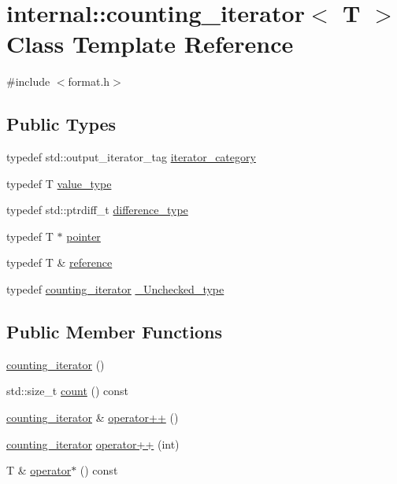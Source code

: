 \hypertarget{classinternal_1_1counting__iterator}{}\section{internal\+:\+:counting\+\_\+iterator$<$ T $>$ Class Template Reference}
\label{classinternal_1_1counting__iterator}


{\ttfamily \#include $<$format.\+h$>$}

\subsection*{Public Types}
\begin{DoxyCompactItemize}
\item 
typedef std\+::output\+\_\+iterator\+\_\+tag \hyperlink{classinternal_1_1counting__iterator_a2401fdba243c84c268b562611bed7333}{iterator\+\_\+category}
\item 
typedef T \hyperlink{classinternal_1_1counting__iterator_abc8a1cdd0ab07ab8a4c02df99233017a}{value\+\_\+type}
\item 
typedef std\+::ptrdiff\+\_\+t \hyperlink{classinternal_1_1counting__iterator_a9b409b0895044059511e67a9fb46aff4}{difference\+\_\+type}
\item 
typedef T $\ast$ \hyperlink{classinternal_1_1counting__iterator_a0e58a232d34bffbc41fc5bd7bb75f962}{pointer}
\item 
typedef T \& \hyperlink{classinternal_1_1counting__iterator_a040c67c71ec6569100eda9296fbd914f}{reference}
\item 
typedef \hyperlink{classinternal_1_1counting__iterator}{counting\+\_\+iterator} \hyperlink{classinternal_1_1counting__iterator_ab0bb803614313da57e902e8f5ac2095d}{\+\_\+\+Unchecked\+\_\+type}
\end{DoxyCompactItemize}
\subsection*{Public Member Functions}
\begin{DoxyCompactItemize}
\item 
\hyperlink{classinternal_1_1counting__iterator_af6e3751c9b296b56d7b96975b746abfe}{counting\+\_\+iterator} ()
\item 
std\+::size\+\_\+t \hyperlink{classinternal_1_1counting__iterator_a452e9d9c9038962166ddb7be18d2f029}{count} () const
\item 
\hyperlink{classinternal_1_1counting__iterator}{counting\+\_\+iterator} \& \hyperlink{classinternal_1_1counting__iterator_a30040f9f47ccc17bb246fa0d55795e63}{operator++} ()
\item 
\hyperlink{classinternal_1_1counting__iterator}{counting\+\_\+iterator} \hyperlink{classinternal_1_1counting__iterator_add98096772b9b8e8f5da7ae625c000c5}{operator++} (int)
\item 
T \& \hyperlink{classinternal_1_1counting__iterator_a2e24e30b8971f6662bcc4eac695a9d36}{operator$\ast$} () const
\end{DoxyCompactItemize}



